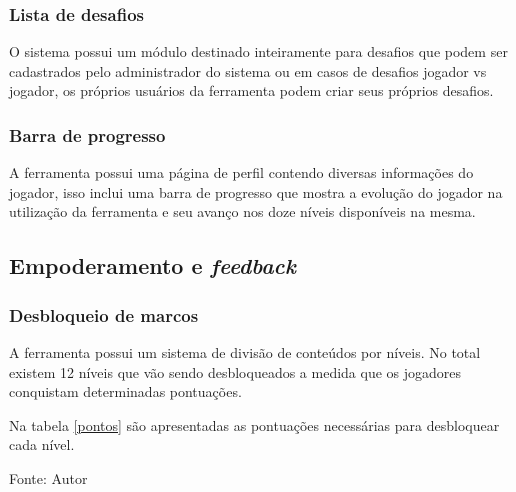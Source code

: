 \subsubsection{Lista de desafios}
	O sistema possui um módulo destinado inteiramente para desafios que podem ser cadastrados pelo administrador do sistema ou em casos de desafios jogador vs jogador, os próprios
 usuários da ferramenta podem criar seus próprios desafios.

\subsubsection{Barra de progresso}

	A ferramenta possui uma página de perfil contendo diversas informações do jogador, isso inclui uma barra de progresso que mostra a evolução do jogador na utilização da
 ferramenta e seu avanço nos doze níveis disponíveis na mesma.

 \subsection{Empoderamento e \textit{feedback}}
	 \subsubsection{Desbloqueio de marcos}
	A ferramenta possui um sistema de divisão de conteúdos por níveis. No total existem 12 níveis que vão sendo desbloqueados a medida que os jogadores conquistam determinadas pontuações.

	Na tabela \ref{pontos} são apresentadas as pontuações necessárias para desbloquear cada nível.


\begin{table}[h]
	\centering
	\caption{Pontuações}
	\label{pontos}
	Fonte: Autor
\end{table}

